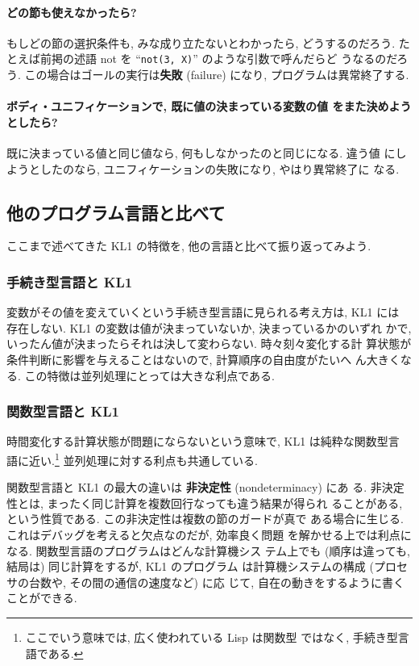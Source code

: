 \documentclass[a4,titlepage]{jsreport}
\def\em{\bf\dg}
\let\dg\bf
\begin{document}
\paragraph{どの節も使えなかったら?}
もしどの節の選択条件も, みな成り立たないとわかったら, どうするのだろう.
たとえば前掲の述語 not を ``{\tt not(3, X)}'' のような引数で呼んだらど
うなるのだろう.  この場合はゴールの実行は{\em 失敗} (failure) になり, 
プログラムは異常終了する.

\paragraph{ボディ・ユニフィケーションで, 既に値の決まっている変数の値
をまた決めようとしたら?}
既に決まっている値と同じ値なら, 何もしなかったのと同じになる.  違う値
にしようとしたのなら, ユニフィケーションの失敗になり, やはり異常終了に
なる.

\subsection{他のプログラム言語と比べて}
ここまで述べてきた KL1 の特徴を, 他の言語と比べて振り返ってみよう.

\subsubsection{手続き型言語と KL1}
変数がその値を変えていくという手続き型言語に見られる考え方は, KL1 には
存在しない.  KL1 の変数は値が決まっていないか, 決まっているかのいずれ
かで, いったん値が決まったらそれは決して変わらない. 時々刻々変化する計
算状態が条件判断に影響を与えることはないので, 計算順序の自由度がたいへ
ん大きくなる.  この特徴は並列処理にとっては大きな利点である.

\subsubsection{関数型言語と KL1}
時間変化する計算状態が問題にならないという意味で, KL1 は純粋な関数型言
語に近い.\footnote{ここでいう意味では, 広く使われている Lisp は関数型
ではなく, 手続き型言語である.} 並列処理に対する利点も共通している.

関数型言語と KL1 の最大の違いは {\em 非決定性} (non\-determinacy) にあ
る.  非決定性とは, まったく同じ計算を複数回行なっても違う結果が得られ
ることがある, という性質である.  この非決定性は複数の節のガードが真で
ある場合に生じる.  これはデバッグを考えると欠点なのだが, 効率良く問題
を解かせる上では利点になる.  関数型言語のプログラムはどんな計算機シス
テム上でも (順序は違っても, 結局は) 同じ計算をするが, KL1 のプログラム
は計算機システムの構成 (プロセサの台数や, その間の通信の速度など) に応
じて, 自在の動きをするように書くことができる.
\end{document}
